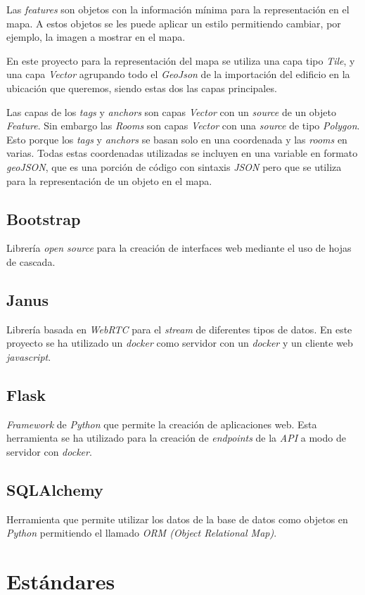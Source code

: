 Las \textit{features} son objetos con la información mínima para la representación en el mapa. A estos objetos se les puede aplicar un estilo permitiendo cambiar, por ejemplo, la imagen a mostrar en el mapa.

En este proyecto para la representación del mapa se utiliza una capa tipo \textit{Tile}, y una capa \textit{Vector} agrupando todo el \textit{GeoJson} de la importación del edificio en la ubicación que queremos, siendo estas dos las capas principales.


Las capas de los \textit{tags} y \textit{anchors} son capas \textit{Vector} con un \textit{source} de un objeto \textit{Feature}. Sin embargo las \textit{Rooms} son capas \textit{Vector }con una \textit{source} de tipo \textit{Polygon}. Esto porque los \textit{tags} y \textit{anchors} se basan solo en una coordenada y las \textit{rooms} en varias. Todas estas coordenadas utilizadas se incluyen en una variable en formato \textit{geoJSON}, que es una porción de código con sintaxis \textit{JSON} pero que se utiliza para la representación de un objeto en el mapa.
\subsection{Bootstrap}
Librería \textit{open source} para la creación de interfaces web mediante el uso de hojas de cascada.
\subsection{Janus}
Librería basada en \textit{WebRTC} para el \textit{stream} de diferentes tipos de datos. En este proyecto se ha utilizado un \textit{docker} como servidor con un \textit{docker} y un cliente web \textit{javascript}.
\subsection{Flask}
\textit{Framework} de \textit{Python} que permite la creación de aplicaciones web. Esta herramienta se ha utilizado para la creación de \textit{endpoints} de la \textit{API} a modo de servidor con \textit{docker}.
\subsection{SQLAlchemy}
Herramienta que permite utilizar los datos de la base de datos como objetos en \textit{Python} permitiendo el llamado \textit{ORM (Object Relational Map)}.

\section{Estándares}
